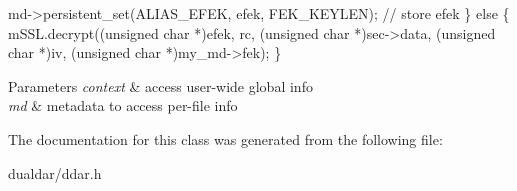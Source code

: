 \begin{DoxyPre}      md->persistent\_set(ALIAS\_EFEK, efek, FEK\_KEYLEN);  // store efek
  \} else \{
      mSSL.decrypt((unsigned char *)efek, rc,
          (unsigned char *)sec->data, (unsigned char *)iv, (unsigned char *)my\_md->fek);
  \}
  \end{DoxyPre}



\begin{DoxyParams}{\-Parameters}
{\em context} & access user-\/wide global info \\
\hline
{\em md} & metadata to access per-\/file info \\
\hline
\end{DoxyParams}


\-The documentation for this class was generated from the following file\-:\begin{DoxyCompactItemize}
\item 
dualdar/ddar.\-h\end{DoxyCompactItemize}
